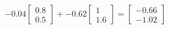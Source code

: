 \documentclass[preview]{standalone}
\begin{document}
\begin{align*}
-0.04 \begin{bmatrix} 0.8 \\ 0.5 \end{bmatrix} + -0.62 \begin{bmatrix} 1 \\ 1.6 \end{bmatrix} = \begin{bmatrix} -0.66 \\ -1.02 \end{bmatrix}
\end{align*}
\end{document}
